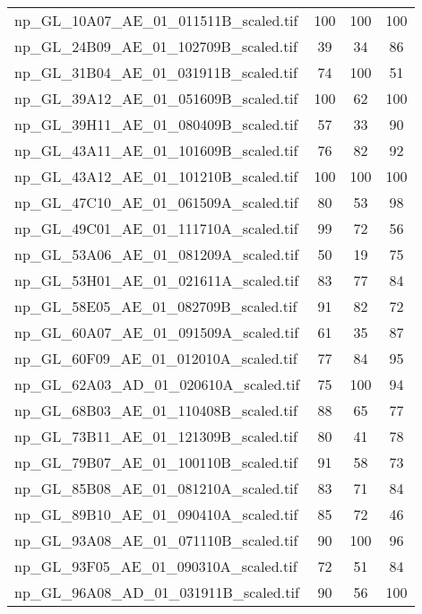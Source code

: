 \begin{tabular}{lccc}
 np\_GL\_10A07\_AE\_01\_011511B\_scaled.tif     & 100   & 100   & 100   \\
 np\_GL\_24B09\_AE\_01\_102709B\_scaled.tif     & 39    & 34    & 86    \\
 np\_GL\_31B04\_AE\_01\_031911B\_scaled.tif     & 74    & 100   & 51    \\
 np\_GL\_39A12\_AE\_01\_051609B\_scaled.tif     & 100   & 62    & 100   \\
 np\_GL\_39H11\_AE\_01\_080409B\_scaled.tif     & 57    & 33    & 90    \\
 np\_GL\_43A11\_AE\_01\_101609B\_scaled.tif     & 76    & 82    & 92    \\
 np\_GL\_43A12\_AE\_01\_101210B\_scaled.tif     & 100   & 100   & 100   \\
 np\_GL\_47C10\_AE\_01\_061509A\_scaled.tif     & 80    & 53    & 98    \\
 np\_GL\_49C01\_AE\_01\_111710A\_scaled.tif     & 99    & 72    & 56    \\
 np\_GL\_53A06\_AE\_01\_081209A\_scaled.tif     & 50    & 19    & 75    \\
 np\_GL\_53H01\_AE\_01\_021611A\_scaled.tif     & 83    & 77    & 84    \\
 np\_GL\_58E05\_AE\_01\_082709B\_scaled.tif     & 91    & 82    & 72    \\
 np\_GL\_60A07\_AE\_01\_091509A\_scaled.tif     & 61    & 35    & 87    \\
 np\_GL\_60F09\_AE\_01\_012010A\_scaled.tif     & 77    & 84    & 95    \\
 np\_GL\_62A03\_AD\_01\_020610A\_scaled.tif     & 75    & 100   & 94    \\
 np\_GL\_68B03\_AE\_01\_110408B\_scaled.tif     & 88    & 65    & 77    \\
 np\_GL\_73B11\_AE\_01\_121309B\_scaled.tif     & 80    & 41    & 78    \\
 np\_GL\_79B07\_AE\_01\_100110B\_scaled.tif     & 91    & 58    & 73    \\
 np\_GL\_85B08\_AE\_01\_081210A\_scaled.tif     & 83    & 71    & 84    \\
 np\_GL\_89B10\_AE\_01\_090410A\_scaled.tif     & 85    & 72    & 46    \\
 np\_GL\_93A08\_AE\_01\_071110B\_scaled.tif     & 90    & 100   & 96    \\
 np\_GL\_93F05\_AE\_01\_090310A\_scaled.tif     & 72    & 51    & 84    \\
 np\_GL\_96A08\_AD\_01\_031911B\_scaled.tif     & 90    & 56    & 100   \\

\end{tabular}
